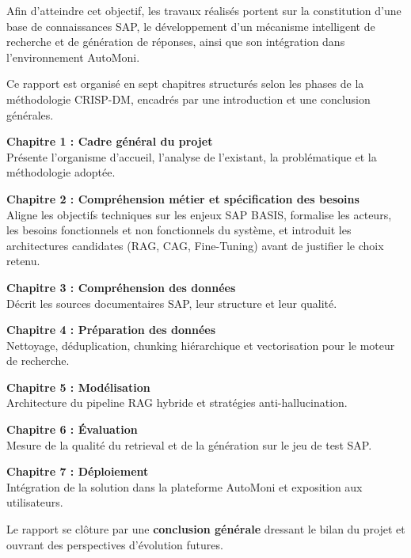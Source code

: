 Afin d’atteindre cet objectif, les travaux réalisés portent sur la constitution d’une base de connaissances SAP, le développement d’un mécanisme intelligent de recherche et de génération de réponses, ainsi que son intégration dans l’environnement AutoMoni.
 



Ce rapport est organisé en sept chapitres structurés selon les phases de la méthodologie
CRISP-DM, encadrés par une introduction et une conclusion générales.

\vspace{0.3cm}

\noindent\textbf{\color{primaryblue}Chapitre 1 : Cadre général du projet}\\
Présente l'organisme d'accueil, l'analyse de l'existant, la problématique et la méthodologie adoptée.

\vspace{0.2cm}

\noindent\textbf{\color{primaryblue}Chapitre 2 : Compréhension métier et spécification des besoins}\\
Aligne les objectifs techniques sur les enjeux SAP BASIS, formalise les acteurs, les besoins fonctionnels et non fonctionnels du système, et introduit les architectures candidates (RAG, CAG, Fine-Tuning) avant de justifier le choix retenu.

\vspace{0.2cm}

\noindent\textbf{\color{primaryblue}Chapitre 3 : Compréhension des données}\\
Décrit les sources documentaires SAP, leur structure et leur qualité.

\vspace{0.2cm}

\noindent\textbf{\color{primaryblue}Chapitre 4 : Préparation des données}\\
Nettoyage, déduplication, chunking hiérarchique et vectorisation pour le moteur de recherche.

\vspace{0.2cm}

\noindent\textbf{\color{primaryblue}Chapitre 5 : Modélisation}\\
Architecture du pipeline RAG hybride et stratégies anti-hallucination.

\vspace{0.2cm}

\noindent\textbf{\color{primaryblue}Chapitre 6 : Évaluation}\\
Mesure de la qualité du retrieval et de la génération sur le jeu de test SAP.

\vspace{0.2cm}

\noindent\textbf{\color{primaryblue}Chapitre 7 : Déploiement}\\
Intégration de la solution dans la plateforme AutoMoni et exposition aux utilisateurs.

\vspace{0.3cm}

\noindent
Le rapport se clôture par une \textbf{conclusion générale} dressant le bilan du projet et
ouvrant des perspectives d'évolution futures.
